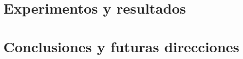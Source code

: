 \documentclass[conference]{IEEEtran}
\begin{document}
\section{Experimentos y resultados}
\label{sec:experiments}

\section{Conclusiones y futuras direcciones}
\label{sec:conclusions}











\end{document}
